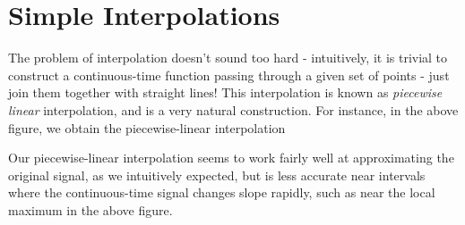\documentclass[letterpaper]{article}
\theoremstyle{remark}
\begin{document}
\section{Simple Interpolations}
The problem of interpolation doesn't sound too hard - intuitively, it is trivial to construct a continuous-time function passing through a given set of points - just join them together with straight lines! This interpolation is known as \emph{piecewise linear} interpolation, and is a very natural construction. For instance, in the above figure, we obtain the piecewise-linear interpolation
\begin{center}
\end{center}
Our piecewise-linear interpolation seems to work fairly well at approximating the original signal, as we intuitively expected, but is less accurate near intervals where the continuous-time signal changes slope rapidly, such as near the local maximum in the above figure.
\end{document}
